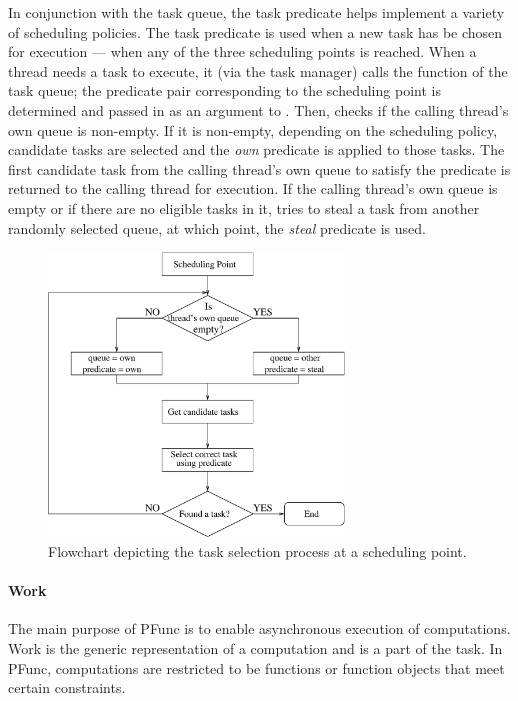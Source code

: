 %
In conjunction with the task queue, the task predicate helps implement a
variety of scheduling policies.
%
The task predicate is used when a new task has be chosen for execution --- when
any of the three scheduling points  is reached.
%
When a thread needs a task to execute, it (via the task manager) calls the
 function of the task queue; the predicate pair corresponding to the
scheduling point is determined and passed in as an argument to .
%
Then,  checks if the calling thread's own queue is non-empty. 
%
If it is non-empty, depending on the scheduling policy, candidate tasks are 
selected and the \emph{own} predicate is applied to those tasks.
%
The first candidate task from the calling thread's own queue to satisfy the 
predicate is returned to the calling thread for execution.
%
If the calling thread's own queue is empty or if there are no eligible tasks in
it,  tries to steal a task from another randomly selected queue, at
which point, the \emph{steal} predicate is used.

\begin{figure}
\centering
\includegraphics[width=0.7\textwidth]{figs/scheduling}
\caption{Flowchart depicting the task selection process at a scheduling point.}
\label{fig:scheduling}
\end{figure}

\paragraph{Work}
%
The main purpose of PFunc is to enable asynchronous execution of computations.
%
Work is the generic representation of a computation and is a part of the task.
%
In PFunc, computations are restricted to be functions or function objects that 
meet certain constraints.

